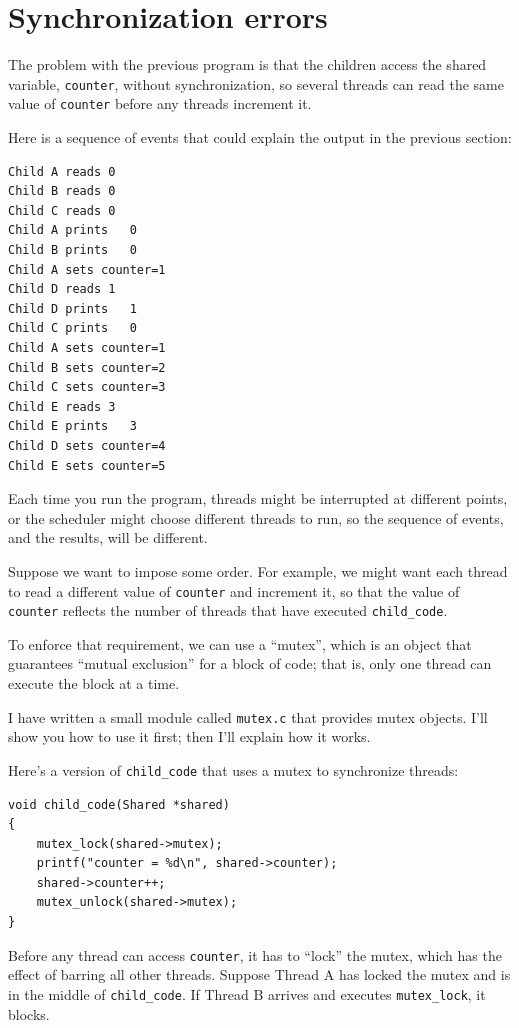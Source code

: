 \documentclass[12pt]{book}
\begin{document}
{\section{Synchronization errors}

The problem with the previous program is that the children
access the shared variable, {\tt counter}, without synchronization,
so several threads can read the same value of {\tt counter} before
any threads increment it.

Here is a sequence of events that could explain the output in the
previous section:

\begin{verbatim}
Child A reads 0
Child B reads 0
Child C reads 0
Child A prints   0
Child B prints   0
Child A sets counter=1
Child D reads 1
Child D prints   1
Child C prints   0
Child A sets counter=1
Child B sets counter=2
Child C sets counter=3
Child E reads 3
Child E prints   3
Child D sets counter=4
Child E sets counter=5
\end{verbatim}

Each time you run the program, threads might be interrupted at different
points, or the scheduler might choose different threads to run, so
the sequence of events, and the results, will be different.

Suppose we want to impose some order.  For example, we might want
each thread to read a different value of {\tt counter} and increment
it, so that the value of {\tt counter} reflects the number of
threads that have executed \verb"child_code".

To enforce that requirement, we can use a ``mutex'', which is
an object that guarantees ``mutual exclusion'' for a block of code;
that is, only one thread can execute the block at a time.

I have written a small module called {\tt mutex.c} that provides
mutex objects.  I'll show you how to use it first; then I'll explain
how it works.

Here's a version of \verb"child_code" that uses a mutex to synchronize
threads:

\begin{verbatim}
void child_code(Shared *shared)
{
    mutex_lock(shared->mutex);
    printf("counter = %d\n", shared->counter);
    shared->counter++;
    mutex_unlock(shared->mutex);
}
\end{verbatim}

Before any thread can access {\tt counter}, it has to ``lock''
the mutex, which has the effect of barring all other threads.
Suppose Thread A has locked the mutex and is in the
middle of \verb"child_code".  If Thread B arrives and
executes \verb"mutex_lock", it blocks.

}
\end{document}
